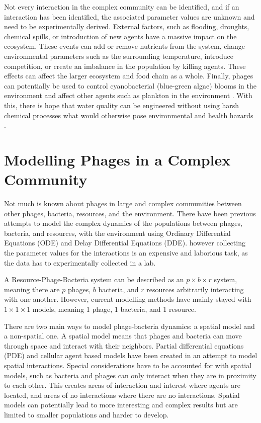 Not every interaction in the complex community can be identified, and if an interaction has been identified, the associated parameter values are unknown and need to be experimentally derived. 
External factors, such as flooding, droughts, chemical spills, or introduction of new agents have a massive impact on the ecosystem. 
These events can add or remove nutrients from the system, change environmental parameters such as the surrounding temperature, introduce competition, or create an imbalance in the population by killing agents. 
These effects can affect the larger ecosystem and food chain as a whole. 
Finally, phages can potentially be used to control cyanobacterial (blue-green algae) blooms in the environment and affect other agents such as plankton in the environment \cite{colomaFrequencyVirusresistantHosts2019}. 
With this, there is hope that water quality can be engineered without using harsh chemical processes what would otherwise pose environmental and health hazards \cite{tuckerIdentificationCyanophageMaLBP2005}. \newline
\newline

\section{Modelling Phages in a Complex Community}
Not much is known about phages in large and complex communities between other phages, bacteria, resources, and the environment. 
There have been previous attempts to model the complex dynamics of the populations between phages, bacteria, and resources, with the environment using Ordinary Differential Equations (ODE) and Delay Differential Equations (DDE).
however collecting the parameter values for the interactions is an expensive and laborious task, as the data has to experimentally collected in a lab. \newline 

A Resource-Phage-Bacteria system can be described as an $p\times b \times r$ system, meaning there are $p$ phages, $b$ bacteria, and $r$ resources arbitrarily interacting with one another. 
However, current modelling methods have mainly stayed with $1\times 1 \times 1$ models, meaning 1 phage, 1 bacteria, and 1 resource. \newline 

There are two main ways to model phage-bacteria dynamics: a spatial model and a non-spatial one.
A spatial model means that phages and bacteria can move through space and interact with their neighbors. 
Partial differential equations (PDE) and cellular agent based models have been created in an attempt to model spatial interactions.
Special considerations have to be accounted for with spatial models, such as bacteria and phages can only interact when they are in proximity to each other.
This creates areas of interaction and interest where agents are located, and areas of no interactions where there are no interactions.
Spatial models can potentially lead to more interesting and complex results but are limited to smaller populations and harder to develop. \newline 

